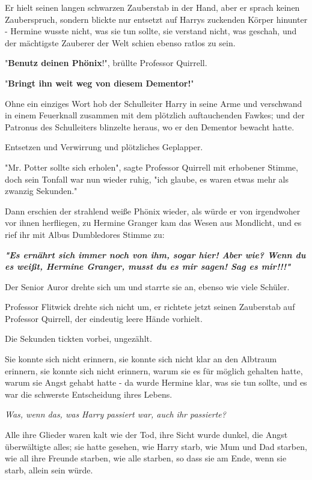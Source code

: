 {Er hielt seinen langen schwarzen Zauberstab in der Hand, aber er sprach keinen Zauberspruch, sondern blickte nur entsetzt auf Harrys zuckenden Körper hinunter - Hermine wusste nicht, was sie tun sollte, sie verstand nicht, was geschah, und der mächtigste Zauberer der Welt schien ebenso ratlos zu sein.

"\textbf{Benutz deinen Phönix}!", brüllte Professor Quirrell.

"\textbf{Bringt ihn weit weg von diesem Dementor!}"

Ohne ein einziges Wort hob der Schulleiter Harry in seine Arme und verschwand in einem Feuerknall zusammen mit dem plötzlich auftauchenden Fawkes; und der Patronus des Schulleiters blinzelte heraus, wo er den Dementor bewacht hatte.

Entsetzen und Verwirrung und plötzliches Geplapper.

"Mr. Potter sollte sich erholen", sagte Professor Quirrell mit erhobener Stimme, doch sein Tonfall war nun wieder ruhig, "ich glaube, es waren etwas mehr als zwanzig Sekunden."

Dann erschien der strahlend weiße Phönix wieder, als würde er von irgendwoher vor ihnen herfliegen, zu Hermine Granger kam das Wesen aus Mondlicht, und es rief ihr mit Albus Dumbledores Stimme zu:

\textbf{\emph{"Es ernährt sich immer noch von ihm, sogar hier! Aber wie? Wenn du es weißt, Hermine Granger, musst du es mir sagen! Sag es mir!!!"}}

Der Senior Auror drehte sich um und starrte sie an, ebenso wie viele Schüler.

Professor Flitwick drehte sich nicht um, er richtete jetzt seinen Zauberstab auf Professor Quirrell, der eindeutig leere Hände vorhielt.

Die Sekunden tickten vorbei, ungezählt.

Sie konnte sich nicht erinnern, sie konnte sich nicht klar an den Albtraum erinnern, sie konnte sich nicht erinnern, warum sie es für möglich gehalten hatte, warum sie Angst gehabt hatte - da wurde Hermine klar, was sie tun sollte, und es war die schwerste Entscheidung ihres Lebens.

\emph{Was, wenn das, was Harry passiert war, auch ihr passierte?}

Alle ihre Glieder waren kalt wie der Tod, ihre Sicht wurde dunkel, die Angst überwältigte alles; sie hatte gesehen, wie Harry starb, wie Mum und Dad starben, wie all ihre Freunde starben, wie alle starben, so dass sie am Ende, wenn sie starb, allein sein würde.

}
